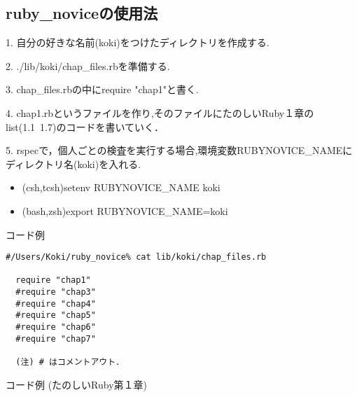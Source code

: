 \subsection{ruby\_noviceの使用法}
1. 自分の好きな名前(koki)をつけたディレクトリを作成する.

2. ./lib/koki/chap\_files.rbを準備する.

3. chap\_files.rbの中にrequire "chap1"と書く.

4. chap1.rbというファイルを作り,そのファイルにたのしいRuby１章のlist(1.1~1.7)のコードを書いていく．

5. rspecで，個人ごとの検査を実行する場合,環境変数RUBYNOVICE\_NAMEにディレクトリ名(koki)を入れる.

\begin{itemize}
\item (csh,tcsh)setenv RUBYNOVICE\_NAME koki
\item (bash,zsh)export RUBYNOVICE\_NAME=koki
\end{itemize}
コード例
\begin{lstlisting}[style=customRuby,basicstyle={\scriptsize\ttfamily}]
  #/Users/Koki/ruby_novice% cat lib/koki/chap_files.rb
  
  require "chap1"
  #require "chap3" 
  #require "chap4"
  #require "chap5"
  #require "chap6"
  #require "chap7"

  (注) # はコメントアウト．
\end{lstlisting}
コード例 (たのしいRuby第１章)
